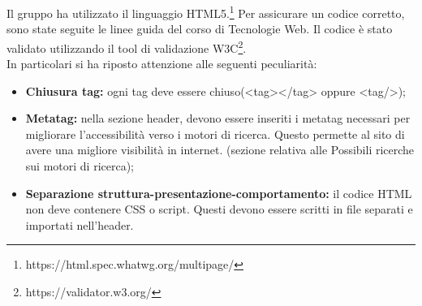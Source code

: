 Il gruppo ha utilizzato il linguaggio HTML5.\footnote{https://html.spec.whatwg.org/multipage/}
Per assicurare un codice corretto, sono state seguite le linee guida del corso di Tecnologie Web.
Il codice è stato validato utilizzando il tool di validazione W3C\footnote{https://validator.w3.org/}.\\
In particolari si ha riposto attenzione alle seguenti peculiarità:
\begin{itemize}
    \item \textbf{Chiusura tag:} ogni tag deve essere chiuso(<tag></tag> oppure <tag/>);
    \item \textbf{Metatag:} nella sezione header, devono essere inseriti i metatag necessari per migliorare l'accessibilità verso i motori
    di ricerca. Questo permette al sito di avere una migliore visibilità in internet. (sezione relativa alle Possibili ricerche sui motori di ricerca);
    \item \textbf{Separazione struttura-presentazione-comportamento:} il codice HTML non deve contenere CSS o script. Questi devono essere
    scritti in file separati e importati nell'header.
\end{itemize}

